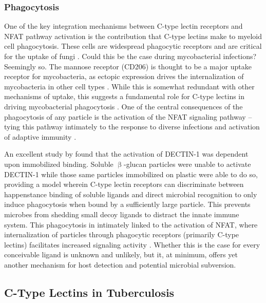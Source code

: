 \subsubsection{Phagocytosis}

One of the key integration mechanisms between C\hyp{}type lectin receptors and NFAT pathway activation is the contribution that C\hyp{}type lectins make to myeloid cell phagocytosis. These cells are widespread phagocytic receptors and are critical for the uptake of fungi \citep{Robinson2006}. Could this be the case during mycobacterial infections? Seemingly so. The mannose receptor (CD206) is thought to be a major uptake receptor for mycobacteria, as ectopic expression drives the internalization of mycobacteria in other cell types \citep{Schlesinger1993}. While this is somewhat redundant with other mechanisms of uptake, this suggests a fundamental role for C\hyp{}type lectins in driving mycobacterial phagocytosis \citep{Ernst1998}. One of the central consequences of the phagocytosis of any particle is the activation of the NFAT signaling pathway -- tying this pathway intimately to the response to diverse infections and activation of adaptive immunity \citep{Khameneh2017}. 

An excellent study by \citet{Goodridge2011} found that the activation of DECTIN\hyp{}1 was dependent upon immobilized binding. Soluble $\upbeta$\hyp{}glucan particles were unable to activate DECTIN\hyp{}1 while those same particles immobilized on plastic were able to do so, providing a model wherein C\hyp{}type lectin receptors can discriminate between happenstance binding of soluble ligands and direct microbial recognition to only induce phagocytosis when bound by a sufficiently large particle. This prevents microbes from shedding small decoy ligands to distract the innate immune system. This phagocytosis in intimately linked to the activation of NFAT, where internalization of particles through phagocytic receptors (primarily C\hyp{}type lectins) facilitates increased signaling activity \citep{Fric2014}. Whether this is the case for every conceivable ligand is unknown and unlikely, but it, at minimum, offers yet another mechanism for host detection and potential microbial subversion.

\subsection{C\hyp{}Type Lectins in Tuberculosis}

